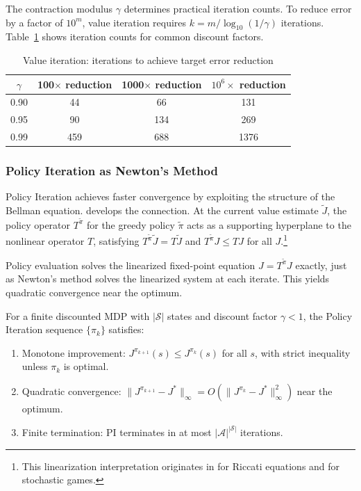The contraction modulus $\gamma$ determines practical iteration counts. To reduce error by a factor of $10^m$, value iteration requires $k = m / \log_{10}(1/\gamma)$ iterations. Table~\ref{tab:vi_iterations} shows iteration counts for common discount factors.

\begin{table}[h!]
\centering
\caption{Value iteration: iterations to achieve target error reduction}
\label{tab:vi_iterations}
\begin{tabular}{c|ccc}
\hline
$\gamma$ & 100$\times$ reduction & 1000$\times$ reduction & $10^6\times$ reduction \\
\hline
0.90 & 44 & 66 & 131 \\
0.95 & 90 & 134 & 269 \\
0.99 & 459 & 688 & 1376 \\
\hline
\end{tabular}
\end{table}


\subsubsection{Policy Iteration as Newton's Method}

Policy Iteration achieves faster convergence by exploiting the structure of the Bellman equation. \citet{bertsekas2022} develops the connection. At the current value estimate $\tilde{J}$, the policy operator $T^{\tilde{\pi}}$ for the greedy policy $\tilde{\pi}$ acts as a supporting hyperplane to the nonlinear operator $T$, satisfying $T^{\tilde{\pi}} \tilde{J} = T\tilde{J}$ and $T^{\tilde{\pi}} J \leq TJ$ for all $J$.\footnote{This linearization interpretation originates in \citet{kleinman1968} for Riccati equations and \citet{pollatschek1969} for stochastic games.}

Policy evaluation solves the linearized fixed-point equation $J = T^{\tilde{\pi}} J$ exactly, just as Newton's method solves the linearized system at each iterate. This yields quadratic convergence near the optimum.

\begin{theorem}
\label{thm:pi_quadratic}
For a finite discounted MDP with $|\mathcal{S}|$ states and discount factor $\gamma < 1$, the Policy Iteration sequence $\{\pi_k\}$ satisfies:
\begin{enumerate}
\item[(a)] Monotone improvement: $J^{\pi_{k+1}}(s) \leq J^{\pi_k}(s)$ for all $s$, with strict inequality unless $\pi_k$ is optimal.
\item[(b)] Quadratic convergence: $\|J^{\pi_{k+1}} - J^*\|_\infty = O(\|J^{\pi_k} - J^*\|_\infty^2)$ near the optimum.
\item[(c)] Finite termination: PI terminates in at most $|\mathcal{A}|^{|\mathcal{S}|}$ iterations.
\end{enumerate}
\end{theorem}

